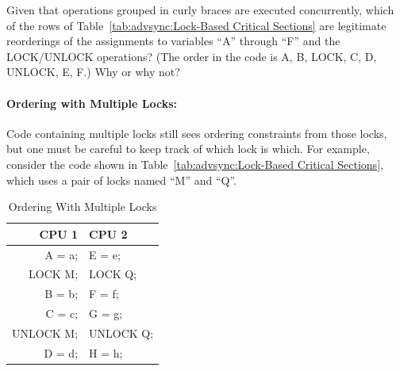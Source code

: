 \QuickQuiz{}
	Given that operations grouped in curly braces are executed
	concurrently, which of the rows of
	Table~\ref{tab:advsync:Lock-Based Critical Sections}
	are legitimate reorderings of the assignments to variables
	``A'' through ``F'' and the LOCK/UNLOCK operations?
	(The order in the code is A, B, LOCK, C, D, UNLOCK, E, F.)
	Why or why not?
 \QuickQuizEnd

\paragraph{Ordering with Multiple Locks:}
Code containing multiple locks still sees ordering constraints from
those locks, but one must be careful to keep track of which lock is which.
For example, consider the code shown in
Table~\ref{tab:advsync:Lock-Based Critical Sections}, which uses
a pair of locks named ``M'' and ``Q''.

\begin{table}[htbp]
\begin{tabular}{r|l}
  CPU 1     & CPU 2 \\
  \hline
  A = a;    & E = e; \\
  LOCK M;   & LOCK Q; \\
  B = b;    & F = f; \\
  C = c;    & G = g; \\
  UNLOCK M; & UNLOCK Q; \\
  D = d;    & H = h; \\
\end{tabular}
\caption{Ordering With Multiple Locks}
\label{tab:advsync:Ordering With Multiple Locks}
\end{table}

